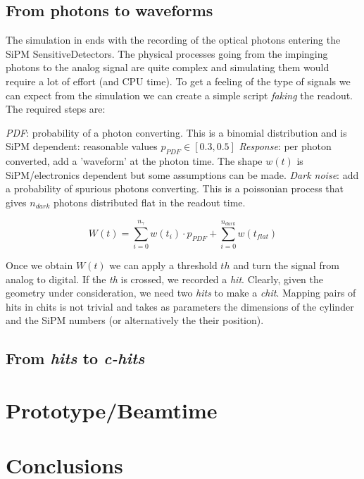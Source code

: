 \begin{refsection}
\subsection{From photons to waveforms}
The simulation in \gf ends with the recording of the optical photons entering the SiPM SensitiveDetectors.
The physical processes going from the impinging photons to the analog signal are quite complex and simulating them would require a lot of effort (and CPU time).
To get a feeling of the type of signals we can expect from the simulation we can create a simple script \textit{faking} the readout.
The required steps are:
\begin{outline}
    \1 \textit{PDF}: probability of a photon converting. 
    This is a binomial distribution and is SiPM dependent: reasonable values $p_{PDF}\in [0.3, 0.5]$
    \1 \textit{Response}: per photon converted, add a 'waveform' at the photon time. 
    The shape $w(t)$ is SiPM/electronics dependent but some assumptions can be made.
    \1 \textit{Dark noise}: add a probability of spurious photons converting. 
    This is a poissonian process that gives $n_{dark}$ photons distributed flat in the readout time.
\end{outline}

\begin{equation}
    W(t)=\sum_{i=0}^{n_\gamma} w(t_i)\cdot p_{PDF} + \sum_{i=0}^{n_{dark}} w(t_{flat})
\end{equation}

Once we obtain $W(t)$ we can apply a threshold $th$ and turn the signal from analog to digital. 
If the \textit{th} is crossed, we recorded a \textit{hit}.
Clearly, given the geometry under consideration, we need two \textit{hits} to make a \textit{chit}.
Mapping pairs of hits in chits is not trivial and takes as parameters the dimensions of the cylinder and the SiPM numbers (or alternatively the their position).

\subsection{From \textit{hits} to \textit{c-hits}}

\section{Prototype/Beamtime}

\section{Conclusions}

\printbibliography[title=Bibliography on muEDM positron tracker]
\end{refsection}